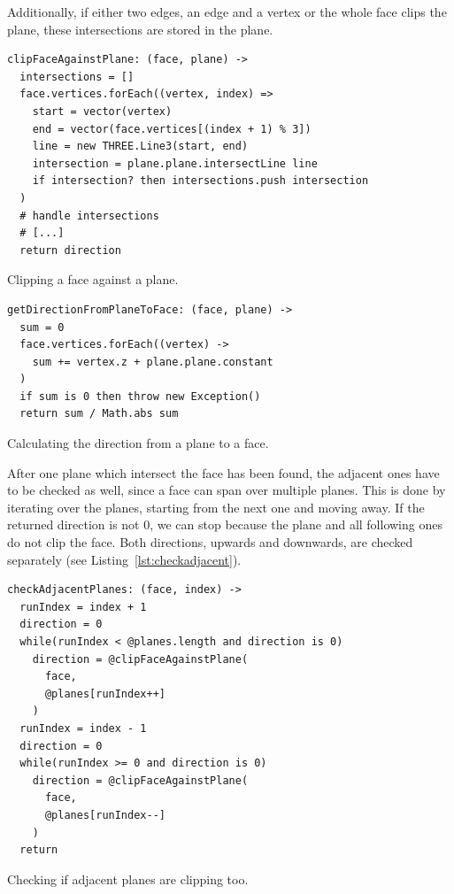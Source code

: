 \documentclass[../ClassicThesis.tex]{subfiles}
\begin{document}
Additionally, if either two edges, an edge and a vertex or the whole face clips the plane, these intersections are stored in the plane.

\begin{listing}
\begin{verbatim}
clipFaceAgainstPlane: (face, plane) ->
  intersections = []
  face.vertices.forEach((vertex, index) =>
    start = vector(vertex)
    end = vector(face.vertices[(index + 1) % 3])
    line = new THREE.Line3(start, end)
    intersection = plane.plane.intersectLine line
    if intersection? then intersections.push intersection
  )
  # handle intersections
  # [...]
  return direction
\end{verbatim}
\caption{Clipping a face against a plane.}
\label{lst:clipfaceplane}
\end{listing}

\begin{listing}
\begin{verbatim}
getDirectionFromPlaneToFace: (face, plane) ->
  sum = 0
  face.vertices.forEach((vertex) ->
    sum += vertex.z + plane.plane.constant
  )
  if sum is 0 then throw new Exception()
  return sum / Math.abs sum
\end{verbatim}
\caption{Calculating the direction from a plane to a face.}
\label{lst:facedirection}
\end{listing}

After one plane which intersect the face has been found, the adjacent ones have to be checked as well, since a face can span over multiple planes. This is done by iterating over the planes, starting from the next one and moving away. If the returned direction is not 0, we can stop because the plane and all following ones do not clip the face. Both directions, upwards and downwards, are checked separately (see Listing~\ref{lst:checkadjacent}).

\begin{listing}
\begin{verbatim}
checkAdjacentPlanes: (face, index) ->
  runIndex = index + 1
  direction = 0
  while(runIndex < @planes.length and direction is 0)
    direction = @clipFaceAgainstPlane(
      face, 
      @planes[runIndex++]
    )
  runIndex = index - 1
  direction = 0
  while(runIndex >= 0 and direction is 0)
    direction = @clipFaceAgainstPlane(
      face, 
      @planes[runIndex--]
    )
  return
\end{verbatim}
\caption{Checking if adjacent planes are clipping too.}
\label{lst:checkadjacent}
\end{listing}
\end{document}
